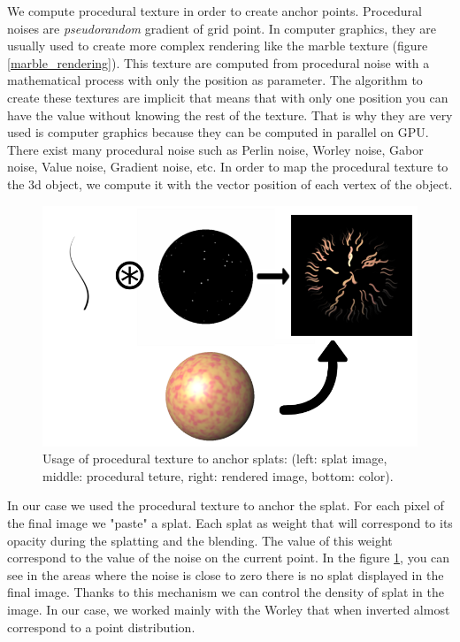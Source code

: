 
We compute procedural texture in order to create anchor points. Procedural noises are \textit{pseudorandom} gradient of grid point. In computer graphics, they are usually used to create more complex rendering like the marble texture (figure \ref{marble_rendering}). This texture are computed from procedural noise with a mathematical process with only the position as parameter. The algorithm to create these textures are implicit that means that with only one position you can have the value without knowing the rest of the texture. That is why they are very used is computer graphics because they can be computed in parallel on GPU. There exist many procedural noise such as Perlin noise, Worley noise, Gabor noise, Value noise, Gradient noise, etc. In order to map the procedural texture to the 3d object, we compute it with the vector position of each vertex of the object.


\begin{figure}[H]
    \begin{center}
    \includegraphics[scale=0.6]{images/noise/addition.png}
    \end{center}
    \caption{Usage of procedural texture to anchor splats: (left: splat image, middle: procedural teture, right: rendered image, bottom: color).}
    \label{procedural_noise_anchor}
\end{figure}

In our case we used the procedural texture to anchor the splat. For each pixel of the final image we "paste" a splat. Each splat as weight that will correspond to its opacity during the splatting and the blending. The value of this weight correspond to the value of the noise on the current point. In the figure \ref{procedural_noise_anchor}, you can see in the areas where the noise is close to zero there is no splat displayed in the final image. Thanks to this mechanism we can control the density of splat in the image. In our case, we worked mainly with the Worley that when inverted almost correspond to a point distribution.



